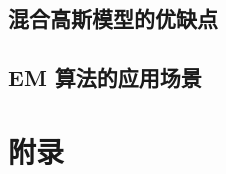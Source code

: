 \documentclass[a4paper,UTF8]{ctexart}
\theoremstyle{plain} \newtheorem{theorem}{定理}[section]
\theoremstyle{plain} \newtheorem{definition}{定义}[section]
\theoremstyle{plain} \newtheorem{lemma}{引理}[section]
\theoremstyle{plain} \newtheorem{proposition}{命题}[section]
\theoremstyle{plain} \newtheorem{example}{例}
\theoremstyle{plain} \newtheorem{remark}{注}
\theoremstyle{plain} \newtheorem{corollary}{推论}[section]
\begin{document}
\subsection{混合高斯模型的优缺点}



\subsection{EM 算法的应用场景}








\newpage

\section*{附录}
\end{document}
